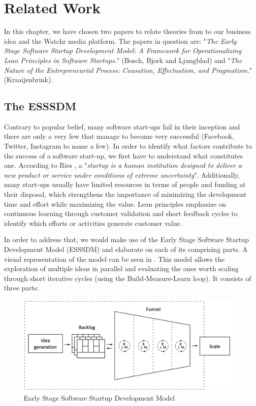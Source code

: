\section{Related Work}
\label{sec:related_work}

In this chapter, we have chosen two papers to relate theories from to our business idea and the Watchr media platform. The papers in question are: "\textit{The Early Stage Software Startup Development Model: A Framework for Operationalizing Lean Principles in Software Startups.}" (Bosch, Bjork and Ljungblad) and "\textit{The Nature of the Entrepreneurial Process: Causation, Effectuation, and Pragmatism.}"(Kraaijenbrink). 

\subsection{The ESSSDM}

Contrary to popular belief, many software start-ups fail in their inception and there are only a very few that manage to become very successful (Facebook, Twitter, Instagram to name a few). In order to identify what factors contribute to the success of a software start-up, we first have to understand what constitutes one. According to Ries \cite{leanStartup}, a "\textit{startup is a human institution designed to deliver a new product or service under conditions of extreme uncertainty}". Additionally, many start-ups usually have limited resources in terms of people and funding at their disposal, which strengthens the importance of minimizing the development time and effort while maximizing the value. Lean principles emphasize on continuous learning through customer validation and short feedback cycles to identify which efforts or activities generate customer value.

In order to address that, we would make use of the Early Stage Software Startup Development Model (ESSSDM) \cite{bosch} and elaborate on each of its comprising parts. A visual representation of the model can be seen in . This model allows the exploration of multiple ideas in parallel and evaluating the ones worth scaling through short iterative cycles (using the Build-Measure-Learn loop). It consists of three parts: 
  
\begin{figure}[h]
\begin{center}
\includegraphics[scale=0.55]{./pics/ESSSDM}
\caption{Early Stage Software Startup Development Model}
\label{fig:esssdm}
\end{center}
\end{figure}

